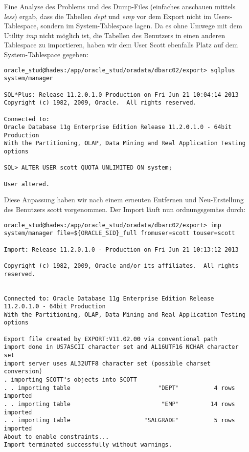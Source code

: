 \documentclass[11pt,a4paper,parskip=half]{scrartcl}
\begin{document}
Eine Analyse des Problems und des Dump-Files (einfaches anschauen mittels \emph{less}) ergab, dass die Tabellen \emph{dept} und \emph{emp} vor dem Export nicht im Users-Tablespace, sondern im System-Tablespace lagen. Da es ohne Umwege mit dem Utility \emph{imp} nicht möglich ist, die Tabellen des Benutzers in einen anderen Tablespace zu importieren, haben wir dem User Scott ebenfalls Platz auf dem System-Tablespace gegeben:
\begin{lstlisting}
oracle_stud@hades:/app/oracle_stud/oradata/dbarc02/export> sqlplus system/manager

SQL*Plus: Release 11.2.0.1.0 Production on Fri Jun 21 10:04:14 2013
Copyright (c) 1982, 2009, Oracle.  All rights reserved.

Connected to:
Oracle Database 11g Enterprise Edition Release 11.2.0.1.0 - 64bit Production
With the Partitioning, OLAP, Data Mining and Real Application Testing options

SQL> ALTER USER scott QUOTA UNLIMITED ON system;

User altered.
\end{lstlisting}

Diese Anpassung haben wir nach einem erneuten Entfernen und Neu-Erstellung des Benutzers scott vorgenommen. Der Import läuft nun ordnungsgemäss durch:
\begin{lstlisting}
oracle_stud@hades:/app/oracle_stud/oradata/dbarc02/export> imp system/manager file=${ORACLE_SID}_full fromuser=scott touser=scott

Import: Release 11.2.0.1.0 - Production on Fri Jun 21 10:13:12 2013

Copyright (c) 1982, 2009, Oracle and/or its affiliates.  All rights reserved.


Connected to: Oracle Database 11g Enterprise Edition Release 11.2.0.1.0 - 64bit Production
With the Partitioning, OLAP, Data Mining and Real Application Testing options

Export file created by EXPORT:V11.02.00 via conventional path
import done in US7ASCII character set and AL16UTF16 NCHAR character set
import server uses AL32UTF8 character set (possible charset conversion)
. importing SCOTT's objects into SCOTT
. . importing table                         "DEPT"          4 rows imported
. . importing table                          "EMP"         14 rows imported
. . importing table                     "SALGRADE"          5 rows imported
About to enable constraints...
Import terminated successfully without warnings.
\end{lstlisting}
\end{document}
